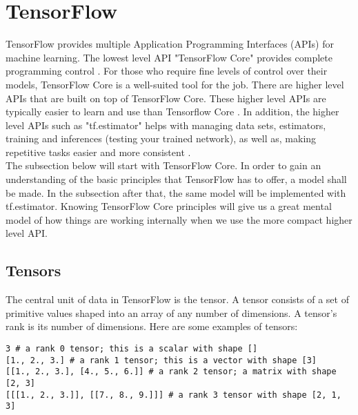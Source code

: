 \section{TensorFlow}

TensorFlow provides multiple Application Programming Interfaces
(APIs) for machine learning. 
The lowest level API "TensorFlow Core" provides complete programming control \cite{tensorflow2015-whitepaper}. 
For those who require fine levels of control over their models,
TensorFlow Core is a well-suited tool for the job. There are higher level APIs that are built on top of TensorFlow Core.
These higher level APIs are typically easier to learn and use than Tensorflow Core \cite{tensorflow2015-whitepaper}.
In addition, the higher level APIs such as "tf.estimator" helps with managing data sets, estimators,
training and inferences (testing your trained network),
as well as, making repetitive tasks easier and more consistent
\cite{tensorflow2015-whitepaper}.\\

The subsection below will start with TensorFlow Core. 
In order to gain an understanding of the basic principles that TensorFlow has to offer, a model shall be made. 
In the subsection after that, the same model will be implemented with tf.estimator. 
Knowing TensorFlow Core principles will give us a great mental model of how things are working internally when we use the more compact higher level API.

\subsection{Tensors}
The central unit of data in TensorFlow is the tensor. 
A tensor consists of a set of primitive values shaped into an array of any number of dimensions. 
A tensor's rank is its number of dimensions. 
Here are some examples of tensors:

\begin{adjustbox}{width=\textwidth}
\begin{lstlisting}
3 # a rank 0 tensor; this is a scalar with shape []
[1., 2., 3.] # a rank 1 tensor; this is a vector with shape [3]
[[1., 2., 3.], [4., 5., 6.]] # a rank 2 tensor; a matrix with shape [2, 3]
[[[1., 2., 3.]], [[7., 8., 9.]]] # a rank 3 tensor with shape [2, 1, 3]
\end{lstlisting} 
\end{adjustbox}

